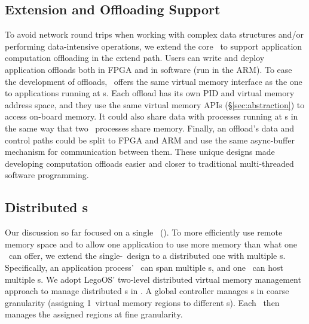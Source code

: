 \subsection{Extension and Offloading Support}
\label{sec:extended}
To avoid network round trips when working with complex data structures and/or performing data-intensive operations,
we extend the core \MN\ to support application computation offloading in the extend path.
Users can write and deploy application offloads both in FPGA and in software (run in the ARM).
To ease the development of offloads, \sys\ offers the same virtual memory interface as the one to applications running at \CN{}s.
Each offload has its own PID and virtual memory address space, and they use the same virtual memory APIs (\S\ref{sec:abstraction}) to access on-board memory. It could also share data with processes running at \CN{}s in the same way that two \CN\ processes share memory.
Finally, an offload’s data and control paths could be split to FPGA and ARM and use the same async-buffer mechanism for communication between them. 
These unique designs made developing computation offloads easier and closer to traditional multi-threaded software programming.


\subsection{Distributed \MN{}s}
\label{sec:dist}
Our discussion so far focused on a single \MN\ (\sysboard).
To more efficiently use remote memory space and to allow one application to use more memory than what one \sysboard\ can offer, we extend the single-\MN\ design to a distributed one with multiple \MN{}s.
Specifically, an application process' \rspace\ can span multiple \MN{}s, and one \MN\ can host multiple \rspace{}s.
We adopt LegoOS' two-level distributed virtual memory management approach to manage distributed \MN{}s in \sys.
A global controller manages \rspace{}s in coarse granularity (assigning 1\GB\ virtual memory regions to different \MN{}s).
Each \MN\ then manages the assigned regions at fine granularity.

